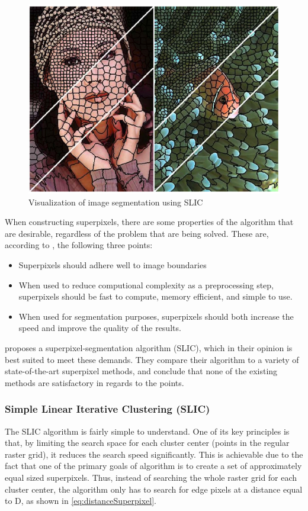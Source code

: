 \begin{figure}[!h]
	\centering
	\includegraphics[scale=0.3]{fig/superpixels}
	\caption{Visualization of image segmentation using SLIC \citep{Achanta2012}}
	\label{fig:superpixels}
\end{figure}

When constructing superpixels, there are some properties of the algorithm that are desirable, regardless of the problem that are being solved. These are, according to \citep{Achanta2012}, the following three points:

\begin{itemize}
	\item Superpixels should adhere well to image boundaries
	\item When used to reduce computional complexity as a preprocessing step, superpixels should be fast to compute, memory efficient, and simple to use.
	\item When used for segmentation purposes, superpixels should both increase the speed and improve the quality of the results.
\end{itemize}

\cite{Achanta2012} proposes a superpixel-segmentation algorithm (SLIC), which in their opinion is best suited to meet these demands. They compare their algorithm to a variety of state-of-the-art superpixel methods, and conclude that none of the existing methods are satisfactory in regards to the points.

\subsubsection*{Simple Linear Iterative Clustering (SLIC)}
The SLIC algorithm is fairly simple to understand. One of its key principles is that, by limiting the search space for each cluster center (points in the regular raster grid), it reduces the search speed significantly. This is achievable due to the fact that one of the primary goals of algorithm is to create a set of approximately equal sized superpixels. Thus, instead of searching the whole raster grid for each cluster center, the algorithm only has to search for edge pixels at a distance equal to D, as shown in \autoref{eq:distanceSuperpixel}.

